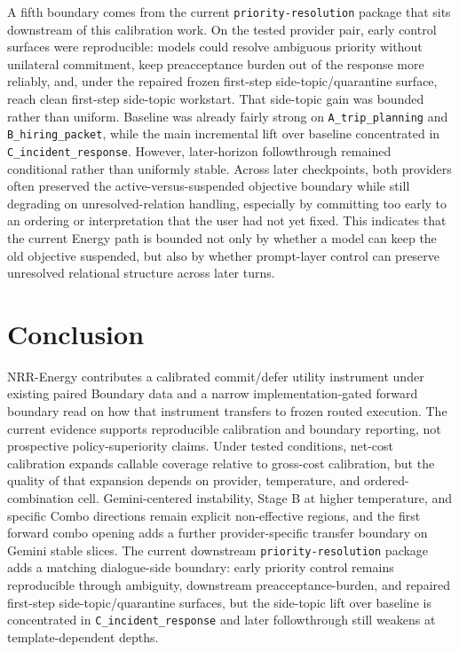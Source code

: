 \documentclass[11pt,a4paper]{article}
\begin{document}
A fifth boundary comes from the current \texttt{priority-resolution} package that sits downstream of this calibration work. On the tested provider pair, early control surfaces were reproducible: models could resolve ambiguous priority without unilateral commitment, keep preacceptance burden out of the response more reliably, and, under the repaired frozen first-step side-topic/quarantine surface, reach clean first-step side-topic workstart. That side-topic gain was bounded rather than uniform. Baseline was already fairly strong on \texttt{A\_trip\_planning} and \texttt{B\_hiring\_packet}, while the main incremental lift over baseline concentrated in \texttt{C\_incident\_response}. However, later-horizon followthrough remained conditional rather than uniformly stable. Across later checkpoints, both providers often preserved the active-versus-suspended objective boundary while still degrading on unresolved-relation handling, especially by committing too early to an ordering or interpretation that the user had not yet fixed. This indicates that the current Energy path is bounded not only by whether a model can keep the old objective suspended, but also by whether prompt-layer control can preserve unresolved relational structure across later turns.

\section{Conclusion}
\label{sec:conclusion}

NRR-Energy contributes a calibrated commit/defer utility instrument under existing paired Boundary data and a narrow implementation-gated forward boundary read on how that instrument transfers to frozen routed execution. The current evidence supports reproducible calibration and boundary reporting, not prospective policy-superiority claims. Under tested conditions, net-cost calibration expands callable coverage relative to gross-cost calibration, but the quality of that expansion depends on provider, temperature, and ordered-combination cell. Gemini-centered instability, Stage B at higher temperature, and specific Combo directions remain explicit non-effective regions, and the first forward combo opening adds a further provider-specific transfer boundary on Gemini stable slices. The current downstream \texttt{priority-resolution} package adds a matching dialogue-side boundary: early priority control remains reproducible through ambiguity, downstream preacceptance-burden, and repaired first-step side-topic/quarantine surfaces, but the side-topic lift over baseline is concentrated in \texttt{C\_incident\_response} and later followthrough still weakens at template-dependent depths.
\end{document}
